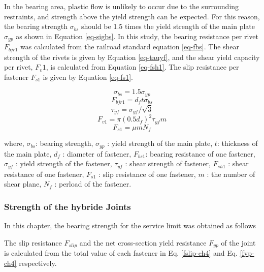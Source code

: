 In the bearing area, plastic flow is unlikely to occur due to the surrounding restraints, and strength above the yield strength can be expected. For this reason, the bearing strength $\sigma_{bs}$ should be 1.5 times the yield strength of the main plate $\sigma_{yp}$ as shown in Equation \ref{eq-sigbs}. In this study, the bearing resistance per rivet $F_{bjr1}$ was calculated from the railroad standard equation \ref{eq-fbs}. The shear strength of the rivets is given by Equation \ref{eq-tauyf}, and the shear yield capacity per rivet, $F_v1$, is calculated from Equation \ref{eq-fsh1}. The slip resistance per fastener $F_{s1}$ is given by Equation \ref{eq-fs1}.

\begin{equation}\label{eq-sigbs}
    \sigma_{bs}=1.5\sigma_{yp}
\end{equation}
\begin{equation}\label{eq-fbs}
    F_{bjr1}=d_f t\sigma_{bs}
\end{equation}
\begin{equation}\label{eq-tauyf}
    \tau_{yf}=\sigma_{yf}/\sqrt{3}
\end{equation}
\begin{equation}\label{eq-fsh1}
    F_{v1}=\pi (0.5d_f)^2 \tau_{yf} m
\end{equation}
\begin{equation}\label{eq-fs1}
    F_{s1}=\mu m N_f
\end{equation}

where, $\sigma_{bs}$: bearing strength, $\sigma_{yp}$ : yield strength of the main plate, $t$: thickness of the main plate, $d_f$ : diameter of fastener, $F_{bs1}$: bearing resistance of one fastener, $\sigma_{yf}$ : yield strength of the fastener, $\tau_{yf}$ : shear strength of fastener, $F_{sh1}$ : shear resistance of one fastener, $F_{s1}$ : slip resistance of one fastener, $m$ : the number of shear plane, $N_f$ : perload of the fastener.


\subsubsection{Strength of the hybride Joints}

In this chapter, the bearing strength for the service limit was obtained as follows

The slip resistance $F_{slip}$ and the net cross-section yield resistance 
$F_{yp}$ of the joint is calculated from the total value of each fastener in Eq. \ref{fslip-ch4} and Eq. \ref{fyp-ch4} respectively.

